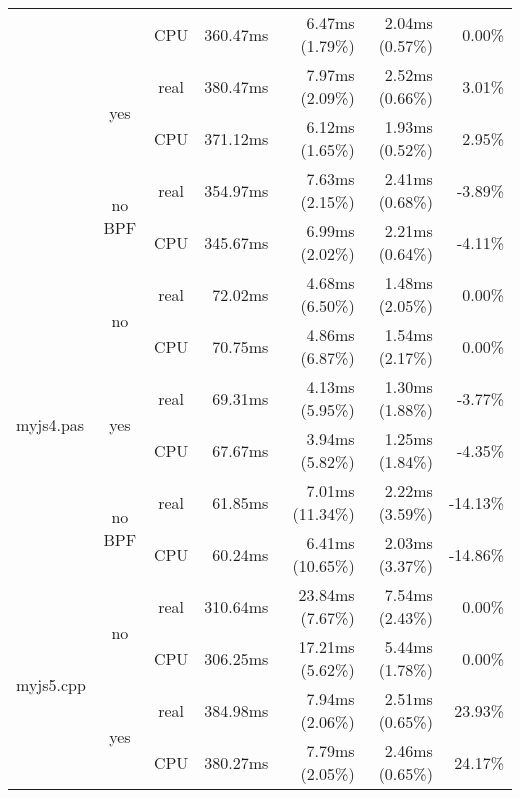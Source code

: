 \documentclass[en]{pracamgr}
\begin{document}
\begin{small}
\begin{longtable}{|l|c|c|r|r|r|r|}
                            &                         & CPU  & 360.47ms & 6.47ms (1.79\%) & 2.04ms (0.57\%) & 0.00\% \\*
                            \cline{2-7}
                            & \multirow{2}{*}{yes}    & real & 380.47ms & 7.97ms (2.09\%) & 2.52ms (0.66\%) & 3.01\% \\*
                            &                         & CPU  & 371.12ms & 6.12ms (1.65\%) & 1.93ms (0.52\%) & 2.95\% \\*
                            \cline{2-7}
                            & \multirow{2}{*}{no BPF} & real & 354.97ms & 7.63ms (2.15\%) & 2.41ms (0.68\%) & -3.89\% \\*
                            &                         & CPU  & 345.67ms & 6.99ms (2.02\%) & 2.21ms (0.64\%) & -4.11\% \\
\hline
\multirow{6}{*}{myjs4.pas}  & \multirow{2}{*}{no}     & real & 72.02ms & 4.68ms (6.50\%) & 1.48ms (2.05\%) & 0.00\% \\*
                            &                         & CPU  & 70.75ms & 4.86ms (6.87\%) & 1.54ms (2.17\%) & 0.00\% \\*
                            \cline{2-7}
                            & \multirow{2}{*}{yes}    & real & 69.31ms & 4.13ms (5.95\%) & 1.30ms (1.88\%) & -3.77\% \\*
                            &                         & CPU  & 67.67ms & 3.94ms (5.82\%) & 1.25ms (1.84\%) & -4.35\% \\*
                            \cline{2-7}
                            & \multirow{2}{*}{no BPF} & real & 61.85ms & 7.01ms (11.34\%) & 2.22ms (3.59\%) & -14.13\% \\*
                            &                         & CPU  & 60.24ms & 6.41ms (10.65\%) & 2.03ms (3.37\%) & -14.86\% \\
\hline
\multirow{6}{*}{myjs5.cpp}  & \multirow{2}{*}{no}     & real & 310.64ms & 23.84ms (7.67\%) & 7.54ms (2.43\%) & 0.00\% \\*
                            &                         & CPU  & 306.25ms & 17.21ms (5.62\%) & 5.44ms (1.78\%) & 0.00\% \\*
                            \cline{2-7}
                            & \multirow{2}{*}{yes}    & real & 384.98ms & 7.94ms (2.06\%) & 2.51ms (0.65\%) & 23.93\% \\*
                            &                         & CPU  & 380.27ms & 7.79ms (2.05\%) & 2.46ms (0.65\%) & 24.17\% \\*

\end{longtable}
\end{small}
\end{document}
